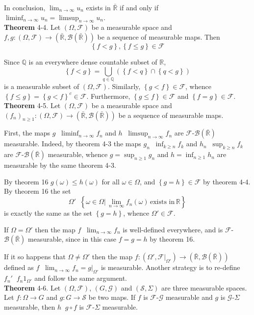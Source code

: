 \documentclass[a4paper]{article}
\newcommand{\obj}[1]{\left\{ #1 \right \}}
\newcommand{\brac}[1]{\left ( #1 \right )}
\newcommand{\induc}[1]{\left . #1 \right \vert}
\newcommand{\Rbar}{{\bar{\mathbb{R}}}}
\newcommand{\Real}{\mathbb{R}}
\newcommand{\Scal}{\mathcal{S}}
\newcommand{\Fcal}{\mathcal{F}}
\newcommand{\borel}[1]{\mathcal{B}\brac{#1}}
\newcommand{\defn}{\mathop{\overset{\Delta}{=}}\nolimits}
\begin{document}
In conclusion, $\lim_{n\to\infty} u_n$ exists in $\Rbar$ if and only if $\liminf_{n\to\infty} u_n = \limsup_{n\to\infty} u_n$.\\

\label{thm:func_ineq_meas} \noindent \textbf{Theorem} 4-4.
Let $\brac{\Omega, \Fcal}$ be a measurable space and $f,g:\brac{\Omega, \Fcal}\to\brac{\Rbar,\borel{\Rbar}}$ be a sequence of measurable maps. Then \[\obj{f<g}, \obj{f\leq g}\in\Fcal\]

Since $\mathbb{Q}$ is an everywhere dense countable subset of $\Real$, \[\obj{f<g} = \bigcup_{q\in \mathbb{Q}} \brac{\obj{f<q}\cap\obj{q<g}}\] is a measurable subset of $\brac{\Omega, \Fcal}$. Similarly, $\obj{g<f}\in \Fcal$, whence $\obj{f\leq g}=\obj{g<f}^c\in \Fcal$. Furthermore, $\obj{g\leq f}\in \Fcal$ and $\obj{f=g}\in \Fcal$.\\

\label{thm:limsup_liminf_meas} \noindent \textbf{Theorem} 4-5.
Let $\brac{\Omega, \Fcal}$ be a measurable space and $\brac{f_n}_{n\geq1}:\brac{\Omega, \Fcal}\to\brac{\Rbar,\borel{\Rbar}}$ be a sequence of measurable maps.

First, the maps $g\defn\liminf_{n\to\infty}f_n$ and $h\defn\limsup_{n\to\infty}f_n$ are $\Fcal$-$\borel{\Rbar}$ measurable. Indeed, by theorem 4-3 the maps $g_n\defn\inf_{k\geq n}f_k$ and $h_n\defn\sup_{k\geq n}f_k$ are $\Fcal$-$\borel{\Rbar}$ measurable, whence $g=\sup_{n\geq1} g_n$ and $h=\inf_{n\geq1} h_n$ are measurable by the same theorem 4-3.

By theorem 16 $g\brac{\omega}\leq h\brac{\omega}$ for all $\omega\in \Omega$, and $\obj{g=h}\in\Fcal$ by theorem 4-4. By theorem 16 the set \[\Omega'\defn \obj{\induc{\omega\in \Omega}\,\lim_{n\to\infty} f_n\brac{\omega}\,\text{exists in}\,\Real}\] is exactly the same as the set $\obj{g=h}$, whence $\Omega'\in \Fcal$.

If $\Omega=\Omega'$ then the map $f\defn \lim_{n\to\infty}f_n$ is well-defined everywhere, and is $\Fcal$-$\borel{\Rbar}$ measurable, since in this case $f=g=h$ by theorem 16. 

If it so happens that $\Omega\neq\Omega'$ then the map $f:\brac{\Omega', \induc{\Fcal}_{\Omega'}}\to\brac{\Rbar,\borel{\Rbar}}$ defined as $f\defn\lim_{n\to\infty} f_n = \induc{g}_{\Omega'}$ is measurable. Another strategy is to re-define $f_n'\defn f_n 1_{\Omega'}$ and follow the same argument.\\

\label{thm:meas_compo} \noindent \textbf{Theorem} 4-6.
Let $\brac{\Omega,\Fcal}$, $\brac{G,\mathcal{G}}$ and $\brac{\Scal,\Sigma}$ are three measurable spaces. Let $f:\Omega\to G$ and $g:G\to \Scal$ be two maps. If $f$ is $\Fcal$-$\mathcal{G}$ measurable and $g$ is $\mathcal{G}$-$\Sigma$ measurable, then $h\defn g\circ f$ is $\Fcal$-$\Sigma$ measurable.
\end{document}
